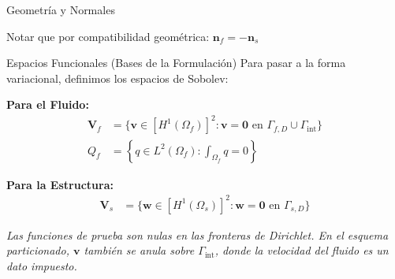 \begin{frame}{Geometría y Normales}
    \begin{figure}[h!]
        \centering
    \end{figure}
    \begin{center}
        Notar que por compatibilidad geométrica: $\mathbf{n}_f = - \mathbf{n}_s$
    \end{center}
\end{frame}

\begin{frame}{Espacios Funcionales (Bases de la Formulación)}
    Para pasar a la forma variacional, definimos los espacios de Sobolev:

    \textbf{Para el Fluido:}
    \begin{align*}
        \mathbf{V}_f &= \{ \mathbf{v} \in [H^1(\Omega_f)]^2 : \mathbf{v} = \mathbf{0} \text{ en } \Gamma_{f,D} \cup \Gamma_{\text{int}} \} \\
        Q_f &= \left\{ q \in L^2(\Omega_f) : \int_{\Omega_f} q = 0 \right\}
    \end{align*}
    
    \textbf{Para la Estructura:}
    \begin{align*}
        \mathbf{V}_s &= \{ \mathbf{w} \in [H^1(\Omega_s)]^2 : \mathbf{w} = \mathbf{0} \text{ en } \Gamma_{s,D} \}
    \end{align*}

    {\small\textit{Las funciones de prueba son nulas en las fronteras de Dirichlet. En el esquema particionado, $\mathbf{v}$ también se anula sobre $\Gamma_{\text{int}}$, donde la velocidad del fluido es un dato impuesto.}\par}
\end{frame}

